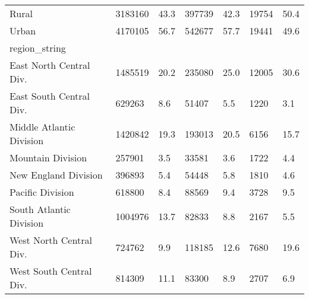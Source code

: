 \begin{longtable}{lllllll}
\midrule
Rural & 3183160 & 43.3 & 397739 & 42.3 & 19754 & 50.4 \\ 
Urban & 4170105 & 56.7 & 542677 & 57.7 & 19441 & 49.6 \\ 
\midrule
\multicolumn{1}{l}{region\_string} \\ 
\midrule
East North Central Div. & 1485519 & 20.2 & 235080 & 25.0 & 12005 & 30.6 \\ 
East South Central Div. & 629263 & 8.6 & 51407 & 5.5 & 1220 & 3.1 \\ 
Middle Atlantic Division & 1420842 & 19.3 & 193013 & 20.5 & 6156 & 15.7 \\ 
Mountain Division & 257901 & 3.5 & 33581 & 3.6 & 1722 & 4.4 \\ 
New England Division & 396893 & 5.4 & 54448 & 5.8 & 1810 & 4.6 \\ 
Pacific Division & 618800 & 8.4 & 88569 & 9.4 & 3728 & 9.5 \\ 
South Atlantic Division & 1004976 & 13.7 & 82833 & 8.8 & 2167 & 5.5 \\ 
West North Central Div. & 724762 & 9.9 & 118185 & 12.6 & 7680 & 19.6 \\ 
West South Central Div. & 814309 & 11.1 & 83300 & 8.9 & 2707 & 6.9 \\ 
\bottomrule
\end{longtable}

